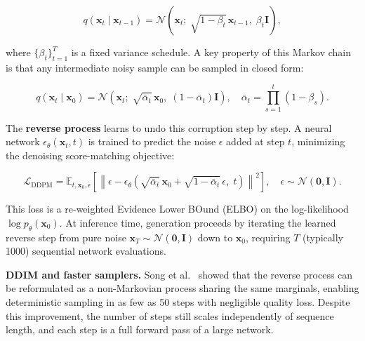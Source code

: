 \documentclass[11pt, a4paper]{article}
\begin{document}
\begin{equation}
    q(\mathbf{x}_t \mid \mathbf{x}_{t-1}) = \mathcal{N}\!\left(\mathbf{x}_t;\;
    \sqrt{1 - \beta_t}\,\mathbf{x}_{t-1},\; \beta_t \mathbf{I}\right),
    \label{eq:forward_process}
\end{equation}

\noindent where $\{\beta_t\}_{t=1}^{T}$ is a fixed variance schedule. A key property of
this Markov chain is that any intermediate noisy sample can be sampled in closed form:

\begin{equation}
    q(\mathbf{x}_t \mid \mathbf{x}_0) = \mathcal{N}\!\left(\mathbf{x}_t;\;
    \sqrt{\bar{\alpha}_t}\,\mathbf{x}_0,\; (1 - \bar{\alpha}_t)\mathbf{I}\right),
    \quad \bar{\alpha}_t = \prod_{s=1}^{t}(1 - \beta_s).
    \label{eq:marginal}
\end{equation}

The \textbf{reverse process} learns to undo this corruption step by step. A neural network
$\epsilon_\theta(\mathbf{x}_t, t)$ is trained to predict the noise $\epsilon$ added at step
$t$, minimizing the denoising score-matching objective:

\begin{equation}
    \mathcal{L}_{\text{DDPM}} = \mathbb{E}_{t,\mathbf{x}_0,\epsilon}\!\left[
    \left\lVert \epsilon - \epsilon_\theta\!\left(\sqrt{\bar{\alpha}_t}\,\mathbf{x}_0 +
    \sqrt{1-\bar{\alpha}_t}\,\epsilon,\; t\right) \right\rVert^2 \right],
    \quad \epsilon \sim \mathcal{N}(\mathbf{0}, \mathbf{I}).
    \label{eq:ddpm_loss}
\end{equation}

\noindent This loss is a re-weighted Evidence Lower BOund (ELBO) on the log-likelihood
$\log p_\theta(\mathbf{x}_0)$. At inference time, generation proceeds by iterating the
learned reverse step from pure noise $\mathbf{x}_T \sim \mathcal{N}(\mathbf{0},\mathbf{I})$
down to $\mathbf{x}_0$, requiring $T$ (typically 1000) sequential network evaluations.

\textbf{DDIM and faster samplers.} Song et al.~\cite{song2020ddim} showed that the reverse
process can be reformulated as a non-Markovian process sharing the same marginals, enabling
deterministic sampling in as few as 50 steps with negligible quality loss. Despite this
improvement, the number of steps still scales independently of sequence length, and each
step is a full forward pass of a large network.

\end{document}
